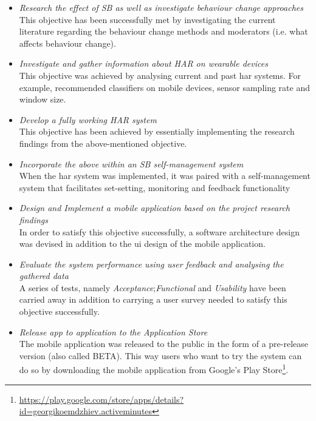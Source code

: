 \begin{itemize}
    \item \textit{Research the effect of SB as well as investigate behaviour change approaches}\\
    This objective has been successfully met by investigating the current literature regarding the behaviour change methods and moderators (i.e. what affects behaviour change).
    \item \textit{Investigate and gather information about HAR on wearable devices}\\
    This objective was achieved by analysing current and past \gls{har} systems. For example, recommended classifiers on mobile devices, sensor sampling rate and window size.
    \item \textit{Develop a fully working HAR system}\\
    This objective has been achieved by essentially implementing the research findings from the above-mentioned objective.
    \item \textit{Incorporate the above within an SB self-management system}\\
    When the \gls{har} system was implemented, it was paired with a self-management system that facilitates set-setting, monitoring and feedback functionality
    \item \textit{Design and Implement a mobile application based on the project research findings}\\
    In order to satisfy this objective successfully, a software architecture design was devised in addition to the \gls{ui} design of the mobile application.
    
    \item \textit{Evaluate the system performance using user feedback and analysing the gathered data}\\
    A series of tests, namely \textit{Acceptance};\textit{Functional} and \textit{Usability} have been carried away in addition to carrying a user survey needed to satisfy this objective successfully.
    
    \item \textit{Release app to application to the Application Store}\\
    The mobile application was released to the public in the form of a pre-release version (also called BETA). This way users who want to try the system can do so by downloading the mobile application from Google's Play Store\footnote{\url{https://play.google.com/store/apps/details?id=georgikoemdzhiev.activeminutes}}.
    
\end{itemize}


